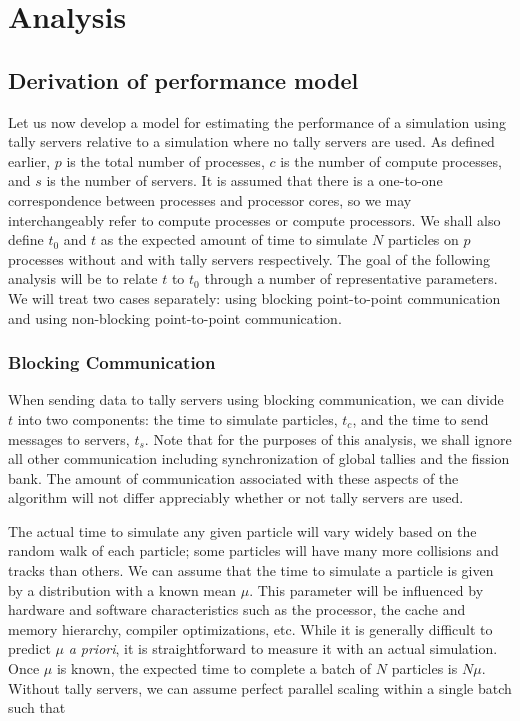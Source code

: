 \documentclass[3p]{elsarticle}
\begin{document}
\section{Analysis}
\label{sec:analysis}

\subsection{Derivation of performance model}

Let us now develop a model for estimating the performance of a simulation using
tally servers relative to a simulation where no tally servers are used. As
defined earlier, $p$ is the total number of processes, $c$ is the number of
compute processes, and $s$ is the number of servers. It is assumed that there is
a one-to-one correspondence between processes and processor cores, so we may
interchangeably refer to compute processes or compute processors. We shall also
define $t_0$ and $t$ as the expected amount of time to simulate $N$ particles on
$p$ processes without and with tally servers respectively. The goal of the
following analysis will be to relate $t$ to $t_0$ through a number of
representative parameters. We will treat two cases separately: using blocking
point-to-point communication and using non-blocking point-to-point
communication.

\subsubsection{Blocking Communication}

When sending data to tally servers using blocking communication, we can divide
$t$ into two components: the time to simulate particles, $t_c$, and the time to
send messages to servers, $t_s$. Note that for the purposes of this analysis, we
shall ignore all other communication including synchronization of global tallies
and the fission bank. The amount of communication associated with these aspects
of the algorithm will not differ appreciably whether or not tally servers are
used.

The actual time to simulate any given particle will vary widely based on the
random walk of each particle; some particles will have many more collisions and
tracks than others. We can assume that the time to simulate a particle is given
by a distribution with a known mean $\mu$. This parameter will be influenced by
hardware and software characteristics such as the processor, the cache and
memory hierarchy, compiler optimizations, etc. While it is generally difficult
to predict $\mu$ \emph{a priori}, it is straightforward to measure it with an
actual simulation. Once $\mu$ is known, the expected time to complete a batch of
$N$ particles is $N\mu$. Without tally servers, we can assume perfect parallel
scaling within a single batch \cite{ane-romano-2012} such that
\end{document}
